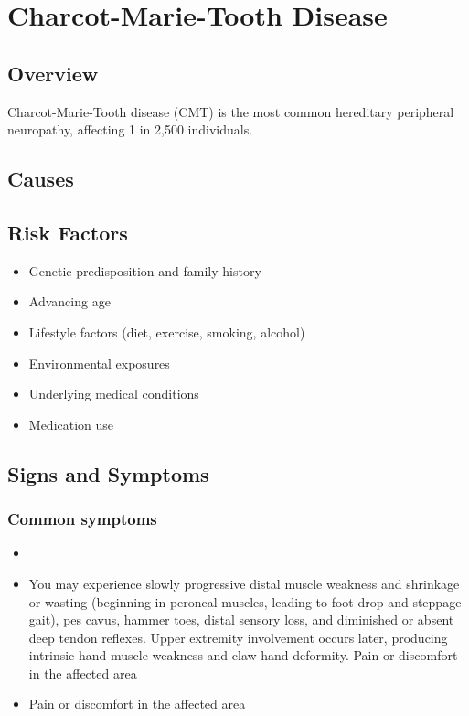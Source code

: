 \chapter{Charcot-Marie-Tooth Disease}
\label{sec:Charcot-Marie-Tooth Disease}

\section{Overview}
Charcot-Marie-Tooth disease (CMT) is the most common hereditary peripheral neuropathy, affecting 1 in 2,500 individuals.
\section{Causes}
\section{Risk Factors}

\begin{itemize}[noitemsep]
  \item Genetic predisposition and family history
  \item Advancing age
  \item Lifestyle factors (diet, exercise, smoking, alcohol)
  \item Environmental exposures
  \item Underlying medical conditions
  \item Medication use
\end{itemize}
\section{Signs and Symptoms}

\subsection{Common symptoms}
\begin{itemize}[noitemsep]
  \item \item You may experience slowly progressive distal muscle weakness and shrinkage or wasting (beginning in peroneal muscles, leading to foot drop and steppage gait), pes cavus, hammer toes, distal sensory loss, and diminished or absent deep tendon reflexes. Upper extremity involvement occurs later, producing intrinsic hand muscle weakness and claw hand deformity. Pain or discomfort in the affected area    \item Pain or discomfort in the affected area
  \end{itemize}

